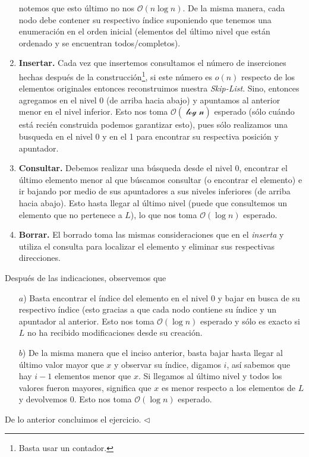 \begin{enumerate}
\begin{center}
  \end{center}
  notemos que esto último no nos $\mathcal{O}(n \log n)$. De la misma manera, cada nodo debe contener su respectivo índice
  suponiendo que tenemos una enumeración en el orden inicial (elementos del último nivel que están ordenado y se encuentran
  todos/completos).
\item \textbf{Insertar.} Cada vez que insertemos consultamos el número de inserciones hechas después de la
  construcción\footnote{Basta usar un contador.}, si este número es $o(n)$ respecto de los elementos originales
  entonces reconstruimos nuestra \textit{Skip-List}. Sino, entonces agregamos en el nivel 0 (de arriba hacia abajo)
  y apuntamos al anterior menor en el nivel inferior. Esto nos toma $\mathcal{O(\log n)}$ esperado (sólo cuándo
  está recién construida podemos garantizar esto), pues sólo realizamos una busqueda en el nivel 0 y en el 1 para
  encontrar su respectiva posición y apuntador.
\item \textbf{Consultar.} Debemos realizar una búsqueda desde el nivel 0, encontrar el último elemento menor al que búscamos
  consultar (o encontrar el elemento) e ir bajando por medio de sus apuntadores a sus niveles inferiores
  (de arriba hacia abajo). Esto hasta llegar al último nivel (puede que consultemos un elemento que no pertenece a $L$),
  lo que nos toma $\mathcal{O}(\log n)$ esperado.
\item \textbf{Borrar.} El borrado toma las mismas consideraciones que en el \textit{inserta} y utiliza el consulta para
  localizar el elemento y eliminar sus respectivas direcciones.
\end{enumerate}
Después de las indicaciones, observemos que
\begin{itemize}
\item[$a$)] Basta encontrar el índice del elemento en el nivel 0 y bajar en busca de su respectivo índice (esto
  gracias a que cada nodo contiene su índice y un apuntador al anterior. Esto nos toma $\mathcal{O}(\log n)$ esperado
  y sólo es exacto si $L$ no ha recibido modificaciones desde su creación.
\item[$b$)] De la misma manera que el inciso anterior, basta bajar hasta llegar al último valor mayor que $x$
  y observar su índice, digamos $i$, así sabemos que hay $i - 1$ elementos menor que $x$. Si llegamos al último
  nivel y todos los valores fueron mayores, significa que $x$ es menor respecto a los elementos de $L$ y devolvemos 0.
  Esto nos toma $\mathcal{O}(\log n)$ esperado.
\end{itemize}
  De lo anterior concluimos el ejercicio.
\hfill $\lhd$


